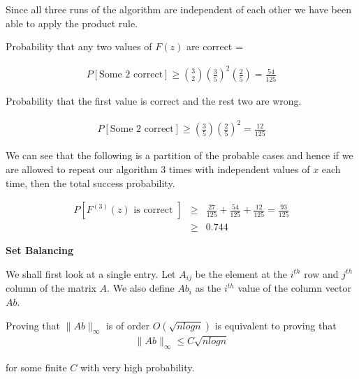 \documentclass{assignment}
\begin{document}
\begin{problemlist}
\begin{problem}
\begin{answer}
Since all three runs of the algorithm are independent of each other we have been able to apply the product rule. 

Probability that any two values of $F(z)$ are correct =

\begin{eqnarray}
P[\textrm{Some 2 correct} ]  \geq {3 \choose 2} \left( \frac{3}{5} \right) ^2 \left( \frac{2}{5} \right)  = \frac{54}{125}  
\end{eqnarray}

Probability that the first value is correct and the rest two are wrong. 

\begin{eqnarray}
P[\textrm{Some 2 correct} ] \geq  \left( \frac{3}{5} \right)  \left( \frac{2}{5} \right) ^2  = \frac{12}{125} 
\end{eqnarray}

We can see that the following is a partition of the probable cases and hence if we are allowed to repeat our algorithm 3 times with independent values of $x$ each time, then the total success probability. 

\begin{eqnarray}
 P[F^{(3)}(z) \textrm{ is correct }] &  \geq & \frac{27}{125} + \frac{54}{125}  + \frac{12}{125} = \frac{93}{125} \\
 & \geq & 0.744
\end{eqnarray}

\end{answer}


\end{problem}

\pbitem
\begin{problem}

\textbf{Set Balancing} 

\begin{answer}
We shall first look at a single entry. Let $A_{ij}$ be the element at the $i^{th}$ row and $j^{th}$ column of the matrix $A$. We also define $Ab_i$ as the $i^{th}$ value of the column vector $Ab$.

Proving that $\|Ab\|_{\infty}$ is of order $O(\sqrt{n log n})$ is equivalent to proving that
\begin{eqnarray}
\|Ab\|_{\infty} \leq C \sqrt{n log n} 
\end{eqnarray}

for some finite $C$ with very high probability. \\


\end{answer}
\end{problem}
\end{problemlist}
\end{document}
